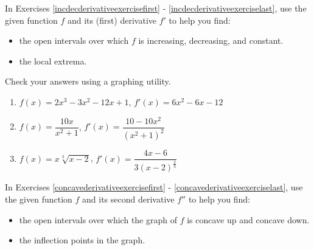\documentclass{ximera}
\begin{document}
	\author{Stitz-Zeager}


\label{ExercisesforAppDerivatives}


In Exercises \ref{incdecderivativeexercisefirst} - \ref{incdecderivativeexerciselast},  use the given function $f$ and its (first) derivative $f'$ to help you find:

\begin{itemize}

\item the open intervals over which $f$ is increasing, decreasing, and constant.

\item the local extrema.

\end{itemize}

Check your answers using a graphing utility.

\begin{enumerate}

\item\label{incdecderivativeexercisefirst} $f(x) = 2x^{3}-3x^{2}-12x + 1$, $f'(x) = 6x^2-6x-12$ %

\smallskip

\item $f(x) = \dfrac{10x}{x^2+1}$, $f'(x) = \dfrac{10-10x^2}{\left(x^2+1\right)^2}$ %

\smallskip

\item\label{incdecderivativeexerciselast} $f(x) = x \sqrt[3]{x-2}$, $f'(x)=\dfrac{4x-6}{3(x-2)^{\frac{2}{3}}}$ %

\smallskip

\setcounter{HW}{\value{enumi}}
\end{enumerate}

In Exercises \ref{concavederivativeexercisefirst} - \ref{concavederivativeexerciselast},  use the given function $f$ and its second derivative $f''$ to help you find:

\begin{itemize}

\item  the open intervals over which the graph of $f$ is concave up and concave down.

\item  the inflection points in the graph.

\end{itemize}
\end{document}
